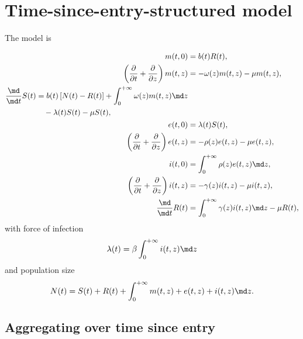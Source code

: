 \documentclass{jpmarticle}
\let\subequationsorig\subequations%
\let\endsubequationsorig\endsubequations%
\renewenvironment{subequations}{
  \subequationsorig
  \renewcommand{\theequation}{\theparentequation.\arabic{equation}}
}{
  \endsubequationsorig
}
\begin{document}
\section{Time-since-entry-structured model}

The model is
\begin{subequations}
  \label{model_time_since_entry_structured}
  \begin{align}
    m(t, 0) &=
    b(t) R(t),
    \\
    \left(\frac{\partial}{\partial t}
      + \frac{\partial}{\partial z}\right)
    m(t, z) &=
    - \omega(z) m(t, z) - \mu m(t, z),
    \\
    \begin{split}
      \frac{\md}{\md t} S(t) &=
      b(t) \left[N(t) - R(t)\right]
      + \int_0^{+\infty} \omega(z) m(t, z) \md z
      \\ & \quad {}
      - \lambda(t) S(t) - \mu S(t),
    \end{split}
    \\
    e(t, 0) &=
    \lambda(t) S(t),
    \\
    \left(\frac{\partial}{\partial t}
      + \frac{\partial}{\partial z}\right)
    e(t, z) &=
    - \rho(z) e(t, z) - \mu e(t, z),
    \\
    i(t, 0) &=
    \int_0^{+\infty} \rho(z) e(t, z) \md z,
    \\
    \left(\frac{\partial}{\partial t}
      + \frac{\partial}{\partial z}\right)
    i(t, z) &=
    - \gamma(z) i(t, z) - \mu i(t, z),
    \\
    \frac{\md}{\md t} R(t) &=
    \int_0^{+\infty} \gamma(z) i(t, z) \md z
    - \mu R(t),
  \end{align}
  with force of infection
  \begin{equation}
    \lambda(t) = \beta \int_0^{+\infty} i(t, z) \md z
  \end{equation}
  and population size
  \begin{equation}
    N(t) =
    S(t) + R(t)
    + \int_0^{+\infty} m(t, z) + e(t, z) + i(t, z) \md z.
  \end{equation}
\end{subequations}


\subsection{Aggregating over time since entry}
\end{document}

